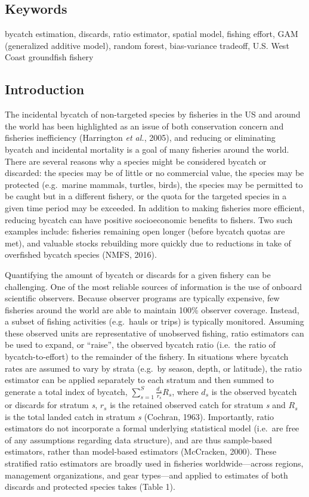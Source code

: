 \documentclass[]{article}
\begin{document}
\subsection{Keywords}\label{keywords}

bycatch estimation, discards, ratio estimator, spatial model, fishing
effort, GAM (generalized additive model), random forest, bias-variance
tradeoff, U.S. West Coast groundfish fishery

\subsection{Introduction}\label{introduction}

The incidental bycatch of non-targeted species by fisheries in the US
and around the world has been highlighted as an issue of both
conservation concern and fisheries inefficiency (Harrington \emph{et
al.}, 2005), and reducing or eliminating bycatch and incidental
mortality is a goal of many fisheries around the world. There are
several reasons why a species might be considered bycatch or discarded:
the species may be of little or no commercial value, the species may be
protected (e.g.~marine mammals, turtles, birds), the species may be
permitted to be caught but in a different fishery, or the quota for the
targeted species in a given time period may be exceeded. In addition to
making fisheries more efficient, reducing bycatch can have positive
socioeconomic benefits to fishers. Two such examples include: fisheries
remaining open longer (before bycatch quotas are met), and valuable
stocks rebuilding more quickly due to reductions in take of overfished
bycatch species (NMFS, 2016).

Quantifying the amount of bycatch or discards for a given fishery can be
challenging. One of the most reliable sources of information is the use
of onboard scientific observers. Because observer programs are typically
expensive, few fisheries around the world are able to maintain 100\%
observer coverage. Instead, a subset of fishing activities (e.g.~hauls
or trips) is typically monitored. Assuming these observed units are
representative of unobserved fishing, ratio estimators can be used to
expand, or ``raise'', the observed bycatch ratio (i.e.~the ratio of
bycatch-to-effort) to the remainder of the fishery. In situations where
bycatch rates are assumed to vary by strata (e.g.~by season, depth, or
latitude), the ratio estimator can be applied separately to each stratum
and then summed to generate a total index of bycatch,
\(\sum_{ s=1 }^{ S }{ \frac { { d }_{ s } }{ { r }_{ s } } } { R }_{ s }\),
where \({ d }_{ s }\) is the observed bycatch or discards for stratum
\emph{s}, \({ r }_{ s }\) is the retained observed catch for stratum
\emph{s} and \({ R }_{ s }\) is the total landed catch in stratum
\emph{s} (Cochran, 1963). Importantly, ratio estimators do not
incorporate a formal underlying statistical model (i.e.~are free of any
assumptions regarding data structure), and are thus sample-based
estimators, rather than model-based estimators (McCracken, 2000). These
stratified ratio estimators are broadly used in fisheries
worldwide---across regions, management organizations, and gear
types---and applied to estimates of both discards and protected species
takes (Table 1).
\end{document}
